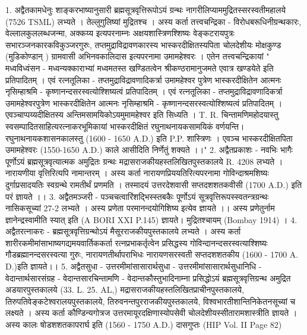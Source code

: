 1. अद्वैतकामधेनुः 
शाङ्करभाष्यानुसारी ब्रह्मसूत्रवृत्तिरूपोऽयं ग्रन्थः नागरीलिप्याममुद्रितस्सरस्वतीमहालये (7526 TSML) लभ्यते । तेल्लुगुलिष्यां मुद्रितश्च । अस्य कर्ता तत्त्वचन्द्रिका - विरोधबरूधिनीग्रन्थकारः, वेल्लालकुललब्धजन्मा, अक्कय्य इत्यपरनाम्नः अक्षयशास्त्रिणश्शिष्यः वेङ्कटरायपुत्रः सभारञ्जनकारकविकुञ्जरगुरुः, तप्तमुद्राविद्रावणकारस्य भास्करदीक्षितस्यपिता चोलदेशीयः मोक्षकुण्ड (मुडिकोण्डान् ) ग्रामवासी अभिनवकालिदास इत्यपरनामा उमामहेश्वरः । एतेन तत्त्वचन्द्रिकायां " मध्वविध्वंसन - मध्वन्यक्काराभ्यां मध्वमतस्त खण्डितत्वेन श्रीकण्ठरामानुजमते एवात्र खण्डयेते इति प्रतिपादितम् । एवं रत्नतूलिका - तप्तमुद्राविद्रावणादिकर्त्रा उमामहेश्वर पुत्रेण भास्करदीक्षितेन आत्मनः नृसिम्हाश्रमि - कृष्णानन्दसरस्वत्योश्शिष्यत्वं प्रतिपादितम् । एवं रत्नतूलिका - तप्तमुद्राविद्रावणादिकर्त्रा उमामहेश्वरपुत्रेण भास्करदीक्षितेन आत्मनः नृसिम्हाश्रमि - कृष्णानन्दसरस्वत्योश्शिष्यत्वं प्रतिपादितम् । एवञ्चाप्पय्यदीक्षितस्य अन्तिमसामयिकोऽयमुमामहेश्वर इति सिध्यति । T. R. चिन्तामणिमहोदयास्तु स्वसम्पादितसाहित्यरत्नाकरभूमिकायां भास्करदीक्षितं रघुनाथनायकसामयिकं वर्णयन्ति। रघुनाथनायकशासनकालस्तु (1600 - 1650 A.D.) इति P.P. शास्त्रिणः । एवञ्च भास्करदीक्षितपिता उमामहेश्वरः (1550-1650 A.D.) काले आसीदिति निर्णेतुं शक्यते ।।"
2. अद्वैतप्रकाशः -
नवभिः भागैः पूर्णोऽयं ब्रह्मसूत्रवृत्यात्मक अमुद्रितः ग्रन्थः मद्रासराजकीयहस्तलिखितपुस्तकालये R. 4208 लभ्यते । नारायणीया वृत्तिरित्यपि नामान्तरम् । अस्य कर्ता नारायणप्रिययतिरित्यपरनामा गोविन्दाश्रमशिष्यः दुर्गाप्रसादयतिः स्वग्रन्थे रामतीर्थं प्रणमति । तस्मादयं उत्तरदेशवासी सप्तदशशतकवीसी (1700 A.D.) इति परं ज्ञायते ।। 
3. अद्वैतमञ्जरी -
पञ्चचत्वारिंशद्भिस्स्तबकैः पूर्णोऽयं सूत्रवृत्तिरूपस्स्वतन्त्रग्रन्थः नासिकसूच्यां 27-2 लभ्यते । अस्य प्रणेता परमानन्दयोगिशिष्य इत्येव ज्ञायते ।। अस्य प्रणेतुर्नाम ज्ञानेन्द्रस्वामीति स्यात् इति (A BORI XXI P.145) ज्ञायते। मुद्रितश्चायम् (Bombay 1914) ।
4. अद्वैतरत्नाकरः -
ब्रह्मसूत्रवृत्तिग्रन्थोऽयं मैसूरराजकीयपुस्तकालये लभ्यते । अस्य कर्ता शारीरकमीमांसाभाष्यगद्यमयवार्तिककर्ता रत्नप्रभाकर्तृत्वेन प्रसिद्धस्य गोविन्दानन्दसरस्वत्याश्शिष्यः गौडब्रह्मानन्दसरस्वत्या गुरुः, नारायणतीर्थापराभिधः नारायणसरस्वती सप्तदशशतकीय (1600 - 1700 A. D.)इति ज्ञायते।। 
5. अद्वैतसुधा - 
उत्तरमीमांसासारार्थसुधा - उत्तरमीमांसासारार्थसुधानिधि - वेदान्तार्थसारसंग्रह - वेदान्तसारचिन्तामणि - वेदान्तकौस्तुभादिनाम्ना प्रसिद्धोऽयं ब्रह्मसूत्रवृत्तिग्रन्थ अमुद्रित अडयारपुस्तकालये (33. L. 25. AL,) मद्रासराजकीयहस्तलिखितप्राचीनपुस्तकालये, तिरुपतिवेङ्कटेश्वरालयपुस्तकालये, तिरुवनन्तपुरराजकीयपुस्तकालये, विश्वभारतीशान्तिनिकेतनसूच्यां च लक्ष्यते । अस्य कर्ता कौण्डिन्यगोत्रज उत्तरमायूरदक्षिणास्योपसेवी चोलदेशीयस्सीतारामशास्त्रीति ज्ञायते । अस्य कालः षोडशशतकापरार्घ इति (1560 - 1750 A.D.) दासगुप्तः (HIP Vol. II Page 82)
